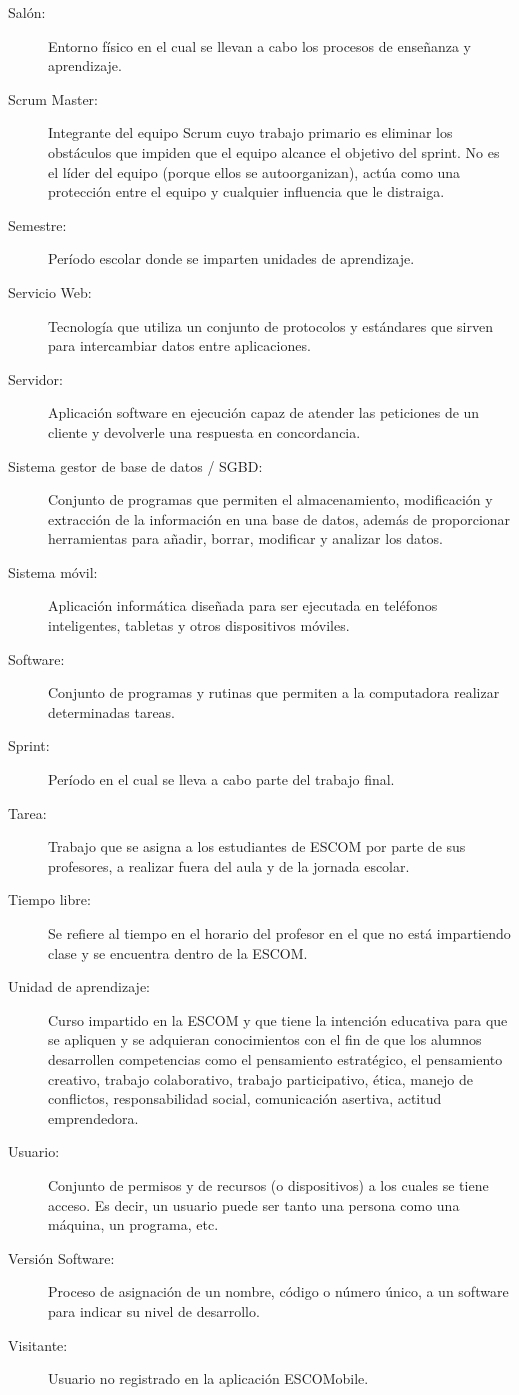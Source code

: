 \begin{description}
	\item[Salón:] Entorno físico en el cual se llevan a cabo los procesos de enseñanza y aprendizaje.
	\item[Scrum Master:] Integrante del equipo Scrum cuyo trabajo primario es eliminar los obstáculos que impiden que el equipo alcance el objetivo del sprint. No es el líder del equipo (porque ellos se autoorganizan), actúa como una protección entre el equipo y cualquier influencia que le distraiga. 
	\item[Semestre:] Período escolar donde se imparten unidades de aprendizaje.
	\item[Servicio Web:] Tecnología que utiliza un conjunto de protocolos y estándares que sirven para intercambiar datos entre aplicaciones.
	\item[Servidor:] Aplicación software en ejecución capaz de atender las peticiones de un cliente y devolverle una respuesta en concordancia.
	\item[Sistema gestor de base de datos / SGBD:] Conjunto de programas que permiten el almacenamiento, modificación y extracción de la información en una base de datos, además de proporcionar herramientas para añadir, borrar, modificar y analizar los datos. 
	\item[Sistema móvil:] Aplicación informática diseñada para ser ejecutada en teléfonos inteligentes, tabletas y otros dispositivos móviles. 
	\item[Software:] Conjunto de programas y rutinas que permiten a la computadora realizar determinadas tareas.
	\item[Sprint:] Período en el cual se lleva a cabo parte del trabajo final. 

	\item[Tarea:] Trabajo que se asigna a los estudiantes de ESCOM por parte de sus profesores, a realizar fuera del aula y de la jornada escolar.
	\item[Tiempo libre:] Se refiere al tiempo en el horario del profesor en el que no está impartiendo clase y se encuentra dentro de la ESCOM.
	
	\item[Unidad de aprendizaje:] Curso impartido en la ESCOM y que tiene la intención educativa para que se apliquen y se adquieran conocimientos con el fin de que los alumnos desarrollen competencias como el pensamiento estratégico, el pensamiento creativo, trabajo colaborativo, trabajo participativo, ética, manejo de conflictos, responsabilidad social, comunicación asertiva, actitud emprendedora.
	\item[Usuario:] Conjunto de permisos y de recursos (o dispositivos) a los cuales se tiene acceso. Es decir, un usuario puede ser tanto una persona como una máquina, un programa, etc.
	
	\item[Versión Software:] Proceso de asignación de un nombre, código o número único, a un software para indicar su nivel de desarrollo.
	\item[Visitante:] Usuario no registrado en la aplicación ESCOMobile.
\end{description}

